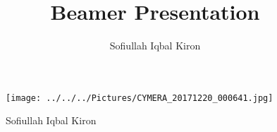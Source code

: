 \documentclass[11pt]{beamer}
\author{Sofiullah Iqbal Kiron}
\title{Beamer Presentation}
\begin{document}
\begin{frame}
\titlepage
\end{frame}

\begin{frame}
\tableofcontents
\end{frame}
\begin{figure}[hbtp]
\centering
\texttt{[image: ../../../Pictures/CYMERA\_20171220\_000641.jpg]}
\caption{Sofiullah Iqbal Kiron}
\end{figure}
\end{document}
